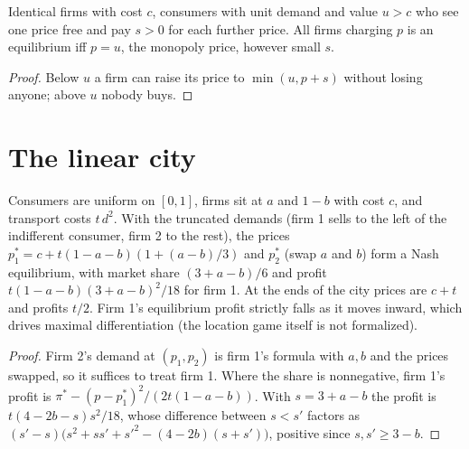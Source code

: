 \begin{theorem}
\label{thm:diamond-paradox}
\leanok
Identical firms with cost $c$, consumers with unit demand and value $u > c$ who see one price free and pay $s > 0$
for each further price. All firms charging $p$ is an equilibrium iff $p = u$, the monopoly price, however small $s$.
\end{theorem}
\begin{proof}
\leanok
Below $u$ a firm can raise its price to $\min(u, p + s)$ without losing anyone; above $u$ nobody buys.
\end{proof}

\section{The linear city}
\label{sec:hotelling}

\begin{theorem}
\label{thm:linear-city}
\leanok
Consumers are uniform on $[0,1]$, firms sit at $a$ and $1-b$ with cost $c$, and transport costs $t\,d^2$. With the
truncated demands (firm 1 sells to the left of the indifferent consumer, firm 2 to the rest), the prices
$p_1^* = c + t(1-a-b)(1 + (a-b)/3)$ and $p_2^*$ (swap $a$ and $b$) form a Nash equilibrium, with market share
$(3+a-b)/6$ and profit $t(1-a-b)(3+a-b)^2/18$ for firm 1. At the ends of the city prices are $c+t$ and profits $t/2$.
Firm 1's equilibrium profit strictly falls as it moves inward, which drives maximal differentiation (the location
game itself is not formalized).
\end{theorem}
\begin{proof}
\leanok
Firm 2's demand at $(p_1, p_2)$ is firm 1's formula with $a, b$ and the prices swapped, so it suffices to treat
firm 1. Where the share is nonnegative, firm 1's profit is $\pi^* - (p - p_1^*)^2/(2t(1-a-b))$. With $s = 3 + a - b$ the
profit is $t(4 - 2b - s)s^2/18$, whose difference between $s < s'$ factors as
$(s'-s)\bigl(s^2 + ss' + s'^2 - (4-2b)(s+s')\bigr)$, positive since $s, s' \ge 3 - b$.
\end{proof}
